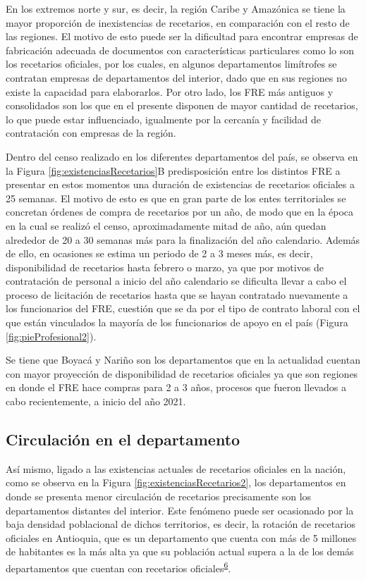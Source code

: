 \documentclass[
  oneside]{book}
\begin{document}
En los extremos norte y sur, es decir, la región Caribe y Amazónica se tiene la mayor proporción de inexistencias de recetarios, en comparación con el resto de las regiones. El motivo de esto puede ser la dificultad para encontrar empresas de fabricación adecuada de documentos con características particulares como lo son los recetarios oficiales, por los cuales, en algunos departamentos limítrofes se contratan empresas de departamentos del interior, dado que en sus regiones no existe la capacidad para elaborarlos. Por otro lado, los FRE más antiguos y consolidados son los que en el presente disponen de mayor cantidad de recetarios, lo que puede estar influenciado, igualmente por la cercanía y facilidad de contratación con empresas de la región.

Dentro del censo realizado en los diferentes departamentos del país, se observa en la Figura \ref{fig:existenciasRecetarios}B predisposición entre los distintos FRE a presentar en estos momentos una duración de existencias de recetarios oficiales a 25 semanas. El motivo de esto es que en gran parte de los entes territoriales se concretan órdenes de compra de recetarios por un año, de modo que en la época en la cual se realizó el censo, aproximadamente mitad de año, aún quedan alrededor de 20 a 30 semanas más para la finalización del año calendario. Además de ello, en ocasiones se estima un periodo de 2 a 3 meses más, es decir, disponibilidad de recetarios hasta febrero o marzo, ya que por motivos de contratación de personal a inicio del año calendario se dificulta llevar a cabo el proceso de licitación de recetarios hasta que se hayan contratado nuevamente a los funcionarios del FRE, cuestión que se da por el tipo de contrato laboral con el que están vinculados la mayoría de los funcionarios de apoyo en el país (Figura \ref{fig:pieProfesional2}).

Se tiene que Boyacá y Nariño son los departamentos que en la actualidad cuentan con mayor proyección de disponibilidad de recetarios oficiales ya que son regiones en donde el FRE hace compras para 2 a 3 años, procesos que fueron llevados a cabo recientemente, a inicio del año 2021.

\hypertarget{circulaciuxf3n-en-el-departamento}{%
\subsection{Circulación en el departamento}\label{circulaciuxf3n-en-el-departamento}}

Así mismo, ligado a las existencias actuales de recetarios oficiales en la nación, como se observa en la Figura \ref{fig:existenciasRecetarios2}, los departamentos en donde se presenta menor circulación de recetarios precisamente son los departamentos distantes del interior. Este fenómeno puede ser ocasionado por la baja densidad poblacional de dichos territorios, es decir, la rotación de recetarios oficiales en Antioquia, que es un departamento que cuenta con más de 5 millones de habitantes es la más alta ya que su población actual supera a la de los demás departamentos que cuentan con recetarios oficiales\textsuperscript{\protect\hyperlink{ref-DANE2021}{6}}.
\end{document}
